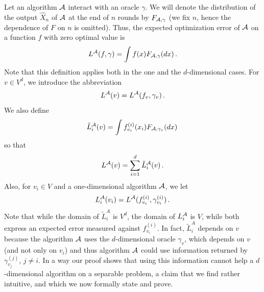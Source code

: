 Let an algorithm $\mathcal{A}$ interact with an oracle $\gamma$.
We will denote the distribution of the output $\hat{X}_n$ of $\mathcal{A}$
at the end of $n$ rounds by $F_{\mathcal{A},\gamma}$ 
(we fix $n$, hence the dependence of $F$ on $n$ is omitted).
Thus, the expected optimization error of $\mathcal{A}$ on a function $f$ with zero optimal value is 
\begin{align*}
L^{\mathcal{A}}(f,\gamma) = \int f(x) F_{\mathcal{A},\gamma}(d x)\,.
\end{align*}
Note that this definition applies both in the one and the $d$-dimensional cases.
For $v\in V^d$, we introduce the abbreviation
\begin{align*}
L^{\mathcal{A}}(v) = L^{\mathcal{A}}(f_v,\gamma_v)\,.
\end{align*}
We also define
\newcommand{\tL}{\tilde{L}}
\begin{align*}
\tL^{\A}_i(v) = \int f_{v_i}^{(i)}( x_i ) F_{\A,\gamma_v}(d x)\,
\end{align*}
so that 
\begin{align*}
L^{\A}(v) = \sum_{i=1}^d \tL^{\A}_i(v)\,.
\end{align*}
Also, for $v_i \in V$ and a one-dimensional algorithm $\mathcal{A}$, we let
\begin{align*}
L^{\mathcal{A}}_i(v_i) = L^{\mathcal{A}}(f_{v_i}^{(i)}, \gamma_{v_i}^{(i)})\,.
\end{align*}
Note that while the domain of $\tL^{A}_i$ is $V^d$, the domain of $L^{\mathcal{A}}_i$ is $V$,
while both express an expected error measured against $f_{v_i}^{(i)}$.
In fact,  $\tL^{A}_i$ depends on $v$ because the algorithm $\mathcal{A}$ uses the $d$-dimensional oracle $\gamma_v$, which depends on $v$ (and not only on $v_i$) and thus algorithm $\mathcal{A}$ could use information returned by $\gamma_{v_j}^{(j)}$, $j\ne i$. In a way our proof shows that using this information cannot help a $d$-dimensional algorithm on a separable problem, a claim that we find rather intuitive, and which we now formally state and prove.

